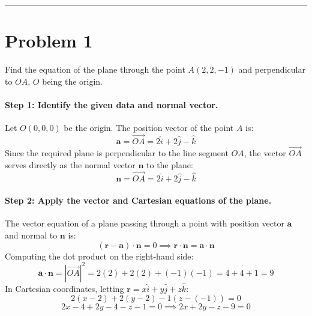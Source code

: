 \documentclass[11pt,a4paper]{article}
\begin{document}
\vspace{0.4cm}
\hrule
\vspace{0.4cm}

\section{Problem 1}
\begin{problembox}[Problem 1]
Find the equation of the plane through the point $A(2, 2, -1)$ and perpendicular to $OA$, $O$ being the origin.
\end{problembox}

\paragraph{Step 1: Identify the given data and normal vector.}
Let $O(0, 0, 0)$ be the origin. The position vector of the point $A$ is:
$$\mathbf{a} = \vec{OA} = 2\hat{i} + 2\hat{j} - \hat{k}$$
Since the required plane is perpendicular to the line segment $OA$, the vector $\vec{OA}$ serves directly as the normal vector $\mathbf{n}$ to the plane:
$$\mathbf{n} = \vec{OA} = 2\hat{i} + 2\hat{j} - \hat{k}$$

\paragraph{Step 2: Apply the vector and Cartesian equations of the plane.}
The vector equation of a plane passing through a point with position vector $\mathbf{a}$ and normal to $\mathbf{n}$ is:
$$(\mathbf{r} - \mathbf{a}) \cdot \mathbf{n} = 0 \implies \mathbf{r} \cdot \mathbf{n} = \mathbf{a} \cdot \mathbf{n}$$
Computing the dot product on the right-hand side:
$$\mathbf{a} \cdot \mathbf{n} = |\vec{OA}|^2 = 2(2) + 2(2) + (-1)(-1) = 4 + 4 + 1 = 9$$
In Cartesian coordinates, letting $\mathbf{r} = x\hat{i} + y\hat{j} + z\hat{k}$:
$$2(x - 2) + 2(y - 2) - 1(z - (-1)) = 0$$
$$2x - 4 + 2y - 4 - z - 1 = 0 \implies 2x + 2y - z - 9 = 0$$
\end{document}
